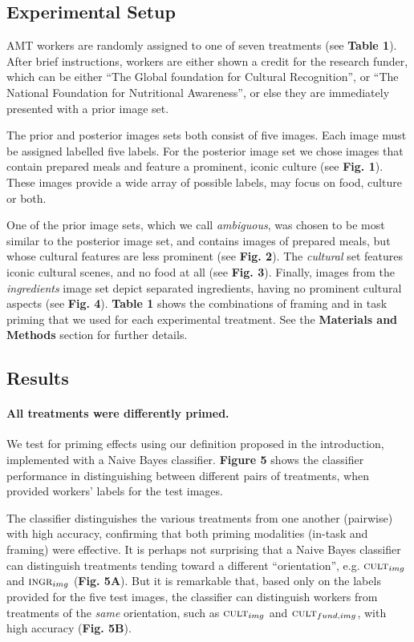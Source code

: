 \documentclass[a4paper]{report}
\begin{document}
\subsection*{Experimental Setup}
AMT workers are randomly assigned to one of seven treatments 
(see \textbf{Table 1}).  After brief instructions, workers are either
shown a credit for the research funder, which can be either 
``The Global foundation for Cultural Recognition'', or 
``The National Foundation for Nutritional Awareness'', or else they are 
immediately presented with a prior image set.

The prior and posterior images sets both consist of five images. Each image 
must be assigned labelled five labels.  For the posterior image set we chose 
images that contain prepared meals and feature a prominent, iconic culture 
(see \textbf{Fig. 1}).  These images provide a wide array of possible labels, 
may focus on food, culture or both.

One of the prior image sets, which we call \textit{ambiguous}, was chosen to
be most similar to the posterior image set, and contains images of prepared
meals, but whose cultural features are less prominent (see \textbf{Fig. 2}).  
The \textit{cultural} set features iconic cultural scenes, and no food at all
(see \textbf{Fig. 3}).  Finally, images from
the \textit{ingredients} image set depict separated ingredients, having no
prominent cultural aspects (see \textbf{Fig. 4}).  \textbf{Table 1} shows the 
combinations of framing and in task priming that we used for each 
experimental treatment.  See the \textbf{Materials and Methods} section for
further details.



\subsection*{Results}
\paragraph{All treatments were differently primed.}
We test for priming effects using our definition proposed in the introduction,
implemented with a Naive Bayes classifier.  \textbf{Figure 5} shows
the classifier performance in distinguishing between different pairs of 
treatments, when provided workers' labels for the test images.

The classifier distinguishes the various treatments from one another (pairwise)
with high accuracy, confirming that both priming modalities 
(in-task and framing) were effective.  It is perhaps not surprising that
a Naive Bayes classifier can distinguish treatments tending toward a different 
``orientation'', e.g. $\textsc{cult}_{img}$ and $\textsc{ingr}_{img}$
(\textbf{Fig. 5A}).
But it is remarkable that, based only on the labels provided for the five test 
images, the classifier can distinguish workers from treatments of the 
\textit{same} orientation, such as $\textsc{cult}_{img}$ and 
$\textsc{cult}_{fund, img}$, with high accuracy (\textbf{Fig. 5B}).
\end{document}

